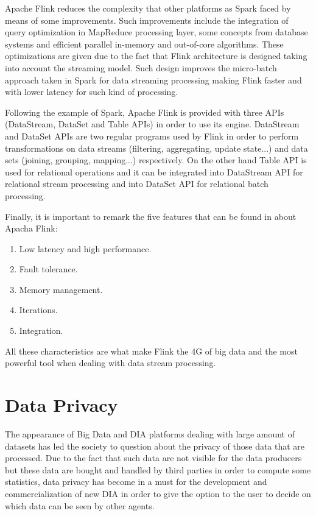 Apache Flink reduces the complexity that other platforms as Spark faced by means of some improvements. Such improvements include the integration of query optimization in MapReduce processing layer, some concepts from database systems and efficient parallel in-memory and out-of-core algorithms. These optimizations are given due to the fact that Flink architecture is designed taking into account the streaming model. Such design improves the micro-batch approach taken in Spark for data streaming processing making Flink faster and with lower latency for such kind of processing.

Following the example of Spark, Apache Flink is provided with three APIs (DataStream, DataSet and Table APIs) in order to use its engine. DataStream and DataSet APIs are two regular programs used by Flink in order to perform transformations on data streams (filtering, aggregating, update state...) and data sets (joining, grouping, mapping...) respectively. On the other hand Table API is used for relational operations and it can be integrated into DataStream API for relational stream processing and into DataSet API for relational batch processing.

Finally, it is important to remark the five features that can be found in \cite{flinkwebsite} about Apacha Flink:

\begin{enumerate}

\item Low latency and high performance.
\item Fault tolerance.
\item Memory management.
\item Iterations.
\item Integration.

\end{enumerate}

All these characteristics are what make Flink the 4G of big data and the most powerful tool when dealing with data stream processing.

\section{Data Privacy}
\label{Data Privacy}

The appearance of Big Data and DIA platforms dealing with large amount of datasets has led the society to question about the privacy of those data that are processed. Due to the fact that such data are not visible for the data producers but these data are bought and handled by third parties in order to compute some statistics, data privacy has become in a must for the development and commercialization of new DIA in order to give the option to the user to decide on which data can be seen by other agents.

